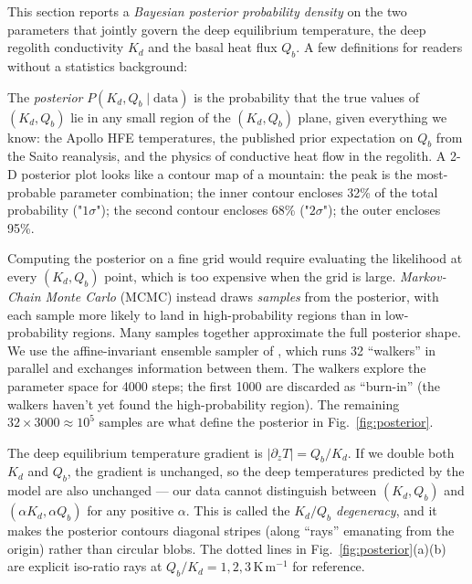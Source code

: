 \documentclass[11pt]{report}
\begin{document}
This section reports a \emph{Bayesian posterior probability density}
on the two parameters that jointly govern the deep equilibrium
temperature, the deep regolith conductivity $K_d$ and the basal
heat flux $Q_b$. A few definitions for readers without a
statistics background:

\begin{aside}
The \emph{posterior} $P(K_d, Q_b \mid \mathrm{data})$ is the
probability that the true values of $(K_d, Q_b)$ lie in any small
region of the $(K_d, Q_b)$ plane, given everything we know: the
Apollo HFE temperatures, the published prior expectation on $Q_b$
from the Saito reanalysis, and the physics of conductive heat flow
in the regolith. A 2-D posterior plot looks like a contour map of a
mountain: the peak is the most-probable parameter combination; the
inner contour encloses 32\% of the total probability ("$1\sigma$");
the second contour encloses 68\% ("$2\sigma$"); the outer encloses
95\%.
\end{aside}

\begin{aside}
Computing the posterior on a fine grid would require evaluating the
likelihood at every $(K_d, Q_b)$ point, which is too expensive when
the grid is large. \emph{Markov-Chain Monte Carlo} (MCMC) instead
draws \emph{samples} from the posterior, with each sample more
likely to land in high-probability regions than in low-probability
regions. Many samples together approximate the full posterior shape.
We use the affine-invariant ensemble sampler of
\citet{foreman_mackey2013emcee}, which runs 32
``walkers'' in parallel and exchanges information between them. The
walkers explore the parameter space for 4000 steps; the first 1000
are discarded as ``burn-in'' (the walkers haven't yet found the
high-probability region). The remaining $32 \times 3000 \approx
10^5$ samples are what define the posterior in
Fig.~\ref{fig:posterior}.
\end{aside}

\begin{aside}
The deep equilibrium temperature gradient is $|\partial_z T| =
Q_b / K_d$. If we double both $K_d$ and $Q_b$, the gradient is
unchanged, so the deep temperatures predicted by the model are also
unchanged --- our data cannot distinguish between
$(K_d, Q_b)$ and $(\alpha K_d, \alpha Q_b)$ for any positive
$\alpha$. This is called the \emph{$K_d/Q_b$ degeneracy}, and it
makes the posterior contours diagonal stripes (along ``rays''
emanating from the origin) rather than circular blobs. The dotted
lines in Fig.~\ref{fig:posterior}(a)(b) are explicit iso-ratio
rays at $Q_b/K_d = 1, 2, 3$\,K\,m$^{-1}$ for reference.
\end{aside}
\end{document}
